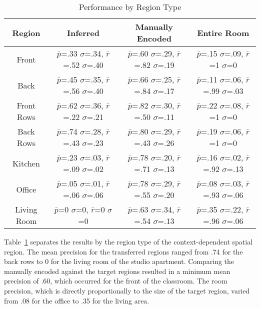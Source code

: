 \begin{table}
\small
\caption{Performance by Region Type}
  \label{tab:region}	
\begin{tabular}{|c|c|c|c|}
\hline
Region & Inferred & Manually Encoded & Entire Room \\
\hline
Front & $\bar{p}$=.33 $\sigma$=.34, $\bar{r}$=.52 $\sigma$=.40 & $\bar{p}$=.60 $\sigma$=.29, $\bar{r}$=.82 $\sigma$=.19  & $\bar{p}$=.15 $\sigma$=.09, $\bar{r}$=1 $\sigma$=0  \\
\hline
Back & $\bar{p}$=.45 $\sigma$=.35, $\bar{r}$=.56 $\sigma$=.40 & $\bar{p}$=.66 $\sigma$=.25, $\bar{r}$=.84 $\sigma$=.17  & $\bar{p}$=.11 $\sigma$=.06, $\bar{r}$=.99 $\sigma$=.03  \\
\hline
Front Rows & $\bar{p}$=.62 $\sigma$=.36, $\bar{r}$=.22 $\sigma$=.21 & $\bar{p}$=.82 $\sigma$=.30, $\bar{r}$=.50 $\sigma$=.11  & $\bar{p}$=.22 $\sigma$=.08, $\bar{r}$=1 $\sigma$=0  \\
\hline
Back Rows & $\bar{p}$=.74 $\sigma$=.28, $\bar{r}$=.43 $\sigma$=.23 & $\bar{p}$=.80 $\sigma$=.29, $\bar{r}$=.43 $\sigma$=.26  & $\bar{p}$=.19 $\sigma$=.06, $\bar{r}$=1 $\sigma$=0  \\
\hline
Kitchen & $\bar{p}$=.23 $\sigma$=.03, $\bar{r}$=.09 $\sigma$=.02 & $\bar{p}$=.78 $\sigma$=.20, $\bar{r}$=.71 $\sigma$=.13  & $\bar{p}$=.16 $\sigma$=.02, $\bar{r}$=.92 $\sigma$=.13  \\
\hline
Office & $\bar{p}$=.05 $\sigma$=.01, $\bar{r}$=.06 $\sigma$=.06 & $\bar{p}$=.78 $\sigma$=.29, $\bar{r}$=.55 $\sigma$=.20  & $\bar{p}$=.08 $\sigma$=.03, $\bar{r}$=.93 $\sigma$=.06  \\
Living Room & $\bar{p}$=0 $\sigma$=0, $\bar{r}$=0 $\sigma$=0 & $\bar{p}$=.63 $\sigma$=.34, $\bar{r}$=.54 $\sigma$=.13  & $\bar{p}$=.35 $\sigma$=.22, $\bar{r}$=.96 $\sigma$=.06  \\
\hline
\end{tabular}
\end{table}

Table~\ref{tab:region} separates the results by the region type of the context-dependent spatial region. The mean precision for the transferred regions ranged from .74 for the back rows to 0 for the living room of the studio apartment. Comparing the manually encoded against the target regions resulted in a minimum mean precision of .60, which occurred for the front of the classroom. The room precision, which is directly proportionally to the size of the target region, varied from .08 for the office to .35 for the living area. 



